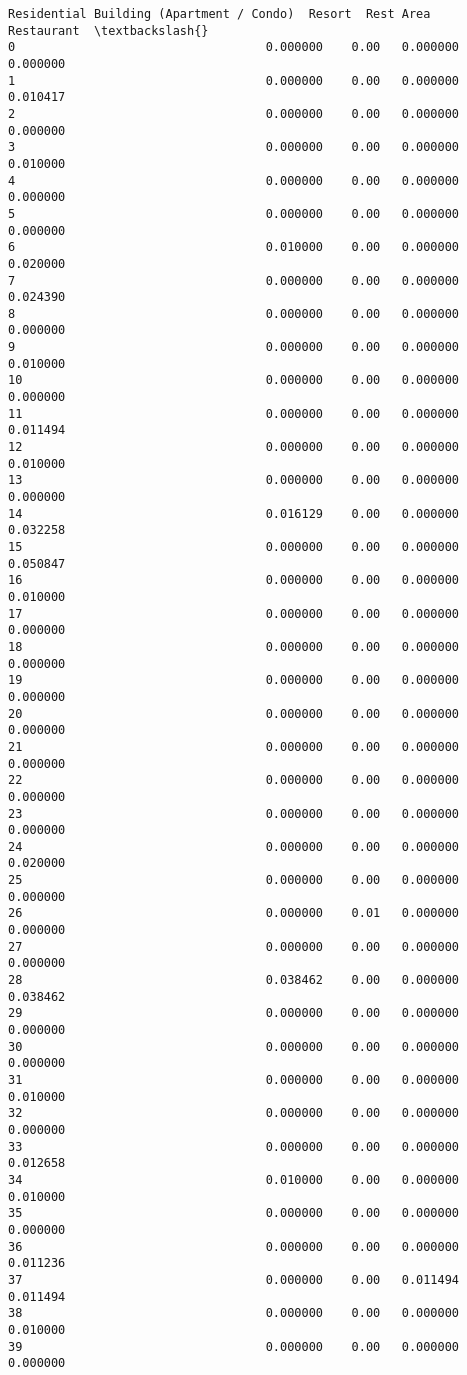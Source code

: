\documentclass[11pt]{article}
\begin{document}
\begin{tcolorbox}[breakable, size=fbox, boxrule=.5pt, pad at break*=1mm, opacityfill=0]
\begin{Verbatim}[commandchars=\\\{\}]
    Residential Building (Apartment / Condo)  Resort  Rest Area  Restaurant  \textbackslash{}
0                                   0.000000    0.00   0.000000    0.000000
1                                   0.000000    0.00   0.000000    0.010417
2                                   0.000000    0.00   0.000000    0.000000
3                                   0.000000    0.00   0.000000    0.010000
4                                   0.000000    0.00   0.000000    0.000000
5                                   0.000000    0.00   0.000000    0.000000
6                                   0.010000    0.00   0.000000    0.020000
7                                   0.000000    0.00   0.000000    0.024390
8                                   0.000000    0.00   0.000000    0.000000
9                                   0.000000    0.00   0.000000    0.010000
10                                  0.000000    0.00   0.000000    0.000000
11                                  0.000000    0.00   0.000000    0.011494
12                                  0.000000    0.00   0.000000    0.010000
13                                  0.000000    0.00   0.000000    0.000000
14                                  0.016129    0.00   0.000000    0.032258
15                                  0.000000    0.00   0.000000    0.050847
16                                  0.000000    0.00   0.000000    0.010000
17                                  0.000000    0.00   0.000000    0.000000
18                                  0.000000    0.00   0.000000    0.000000
19                                  0.000000    0.00   0.000000    0.000000
20                                  0.000000    0.00   0.000000    0.000000
21                                  0.000000    0.00   0.000000    0.000000
22                                  0.000000    0.00   0.000000    0.000000
23                                  0.000000    0.00   0.000000    0.000000
24                                  0.000000    0.00   0.000000    0.020000
25                                  0.000000    0.00   0.000000    0.000000
26                                  0.000000    0.01   0.000000    0.000000
27                                  0.000000    0.00   0.000000    0.000000
28                                  0.038462    0.00   0.000000    0.038462
29                                  0.000000    0.00   0.000000    0.000000
30                                  0.000000    0.00   0.000000    0.000000
31                                  0.000000    0.00   0.000000    0.010000
32                                  0.000000    0.00   0.000000    0.000000
33                                  0.000000    0.00   0.000000    0.012658
34                                  0.010000    0.00   0.000000    0.010000
35                                  0.000000    0.00   0.000000    0.000000
36                                  0.000000    0.00   0.000000    0.011236
37                                  0.000000    0.00   0.011494    0.011494
38                                  0.000000    0.00   0.000000    0.010000
39                                  0.000000    0.00   0.000000    0.000000


\end{Verbatim}
\end{tcolorbox}
\end{document}
